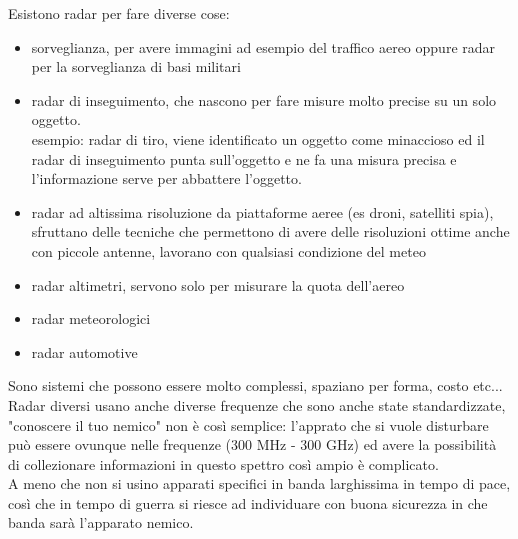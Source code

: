 \documentclass[oneside, 12pt]{extbook}
\begin{document}
Esistono radar per fare diverse cose:
\begin{itemize}
	\item sorveglianza, per avere immagini ad esempio del traffico aereo oppure radar per la sorveglianza di basi militari
	\item radar di inseguimento, che nascono per fare misure molto precise su un solo oggetto.\\
	esempio: radar di tiro, viene identificato un oggetto come minaccioso ed il radar di inseguimento punta sull'oggetto e ne fa una misura precisa e l'informazione serve per abbattere l'oggetto.
	\item radar ad altissima risoluzione da piattaforme aeree (es droni, satelliti spia), sfruttano delle tecniche che permettono di avere delle risoluzioni ottime anche con piccole antenne, lavorano con qualsiasi condizione del meteo
	\item radar altimetri, servono solo per misurare la quota dell'aereo
	\item radar meteorologici
	\item radar automotive
\end{itemize}
Sono sistemi che possono essere molto complessi, spaziano per forma, costo etc...\\
Radar diversi usano anche diverse frequenze che sono anche state standardizzate, "conoscere il tuo nemico" non è così semplice: l'apprato che si vuole disturbare può essere ovunque nelle frequenze (300 MHz - 300 GHz) ed avere la possibilità di collezionare informazioni in questo spettro così ampio è complicato.\\
A meno che non si usino apparati specifici in banda larghissima in tempo di pace, così che in tempo di guerra si riesce ad individuare con buona sicurezza in che banda sarà l'apparato nemico.\\
\end{document}
